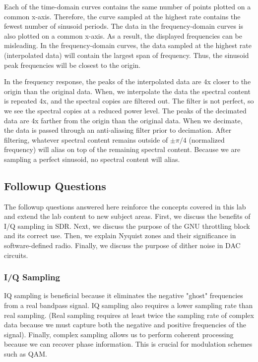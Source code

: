 \documentclass{article}
\begin{document}
Each of the time-domain curves contains the same number of points plotted on a common x-axis. Therefore, the curve sampled at the highest rate contains the fewest number of sinusoid periods. The data in the frequency-domain curves is also plotted on a common x-axis. As a result, the displayed frequencies can be misleading. In the frequency-domain curves, the data sampled at the highest rate (interpolated data) will contain the largest span of frequency. Thus, the sinusoid peak frequencies will be closest to the origin. 

In the frequency response, the peaks of the interpolated data are 4x closer to the origin than the original data. When, we interpolate the data the spectral content is repeated 4x, and the spectral copies are filtered out. The filter is not perfect, so we see the spectral copies at a reduced power level. The peaks of the decimated data are 4x farther from the origin than the original data. When we decimate, the data is passed through an anti-aliasing filter prior to decimation. After filtering, whatever spectral content remains outside of $\pm\pi/4$ (normalized frequency) will alias on top of the remaining spectral content. Because we are sampling a perfect sinusoid, no spectral content will alias.

\subsection{Followup Questions}

The followup questions answered here reinforce the concepts covered in this lab and extend the lab content to new subject areas. First, we discuss the benefits of I/Q sampling in SDR. Next, we discuss the purpose of the GNU throttling block and its correct use. Then, we explain Nyquist zones and their significance in software-defined radio. Finally, we discuss the purpose of dither noise in DAC circuits.



	\subsubsection{I/Q Sampling}
	IQ sampling is beneficial because it eliminates the negative "ghost" frequencies from a real bandpass signal. IQ sampling also requires a lower sampling rate than real sampling. (Real sampling requires at least twice the sampling rate of complex data because we must capture both the negative and positive frequencies of the signal). Finally, complex sampling allows us to perform coherent processing because we can recover phase information. This is crucial for modulation schemes such as QAM.
	
\end{document}

